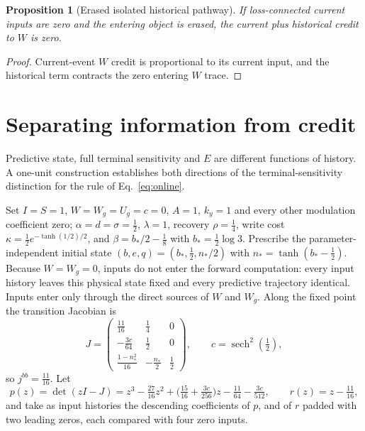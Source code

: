 \documentclass[11pt]{article}
\newtheorem{proposition}[theorem]{Proposition}
\theoremstyle{definition}
\newcommand{\sech}{\operatorname{sech}}
\begin{document}
\begin{proposition}[Erased isolated historical pathway]
\label{thm:delayed}
If loss-connected current inputs are zero and the entering object is erased, the
current plus historical credit to $W$ is zero.
\end{proposition}
\begin{proof}
Current-event $W$ credit is proportional to its current input, and the historical
term contracts the zero entering $W$ trace.
\end{proof}

\section{Separating information from credit}
\label{sec:separation}

Predictive state, full terminal sensitivity and $E$ are different functions of
history. A one-unit construction establishes both directions of the
terminal-sensitivity distinction for the rule of Eq.~\eqref{eq:online}.

Set $I=S=1$, $W=W_g=U_g=c=0$, $A=1$, $k_y=1$ and every other modulation
coefficient zero; $\alpha=d=\sigma=\tfrac12$, $\lambda=1$, recovery
$\rho=\tfrac14$, write cost $\kappa=\tfrac12e^{-\tanh(1/2)/2}$, and
$\beta=b_*/2-\tfrac18$ with $b_*=\tfrac12\log3$. Prescribe the parameter-independent
initial state $(b,e,q)=(b_*,\tfrac12,n_*/2)$ with $n_*=\tanh(b_*-\tfrac12)$. Because
$W=W_g=0$, inputs do not enter the forward computation: every input history leaves
this physical state fixed and every predictive trajectory identical. Inputs enter
only through the direct sources of $W$ and $W_g$. Along the fixed point the
transition Jacobian is
\begin{equation}
 J=\begin{pmatrix}\tfrac{11}{16}&\tfrac14&0\\[2pt]
 -\tfrac{3c}{64}&\tfrac12&0\\[2pt]
 \tfrac{1-n_*^2}{16}&-\tfrac{n_*}{2}&\tfrac12\end{pmatrix},\qquad
 c=\sech^2(\tfrac12),
\end{equation}
so $j^{bb}=\tfrac{11}{16}$. Let
\begin{equation}
 p(z)=\det(zI-J)=z^3-\tfrac{27}{16}z^2+\big(\tfrac{15}{16}+\tfrac{3c}{256}\big)z
 -\tfrac{11}{64}-\tfrac{3c}{512},\qquad r(z)=z-\tfrac{11}{16},
\end{equation}
and take as input histories the descending coefficients of $p$, and of $r$
padded with two leading zeros, each compared with four zero inputs.
\end{document}
